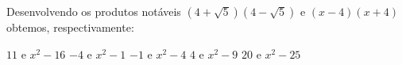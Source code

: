 Desenvolvendo os produtos notáveis $(4+\sqrt{5})(4-\sqrt{5})$ e $(x-4)(x+4)$ obtemos, respectivamente:

$11$ e $x^2-16$
$-4$ e $x^2-1$
$-1$ e $x^2-4$
$4$ e $x^2-9$
$20$ e $x^2-25$


